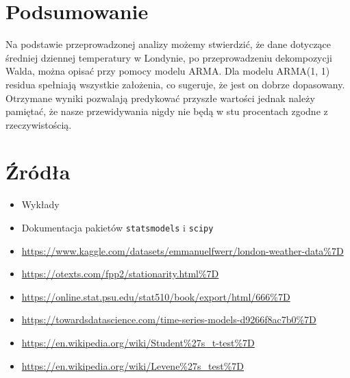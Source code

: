 \documentclass{article}
\theoremstyle{break}
\newcommand{\code}[1]{\colorbox{light-gray}{\texttt{#1}}}
\begin{document}
	\section{Podsumowanie}
	
	Na podstawie przeprowadzonej analizy możemy stwierdzić, że dane dotyczące średniej dziennej temperatury w Londynie, po przeprowadzeniu dekompozycji Walda, można opisać przy pomocy modelu ARMA. Dla modelu ARMA(1, 1) residua spełniają wszystkie założenia, co sugeruje, że jest on dobrze dopasowany. Otrzymane wyniki pozwalają predykować przyszłe wartości jednak należy pamiętać, że nasze przewidywania nigdy nie będą w stu procentach zgodne z rzeczywistością.
	
	\section{Źródła}
	\begin{itemize}
		\item Wykłady
		\item Dokumentacja pakietów \code{statsmodels} i \code{scipy}
		\item \url{https://www.kaggle.com/datasets/emmanuelfwerr/london-weather-data%7D}
		\item \url{https://otexts.com/fpp2/stationarity.html%7D}
		\item \url{https://online.stat.psu.edu/stat510/book/export/html/666%7D}
		\item \url{https://towardsdatascience.com/time-series-models-d9266f8ac7b0%7D}
		\item \url{https://en.wikipedia.org/wiki/Student%27s_t-test%7D}
		\item \url{https://en.wikipedia.org/wiki/Levene%27s_test%7D}
		
	\end{itemize}
	
	
\end{document}
